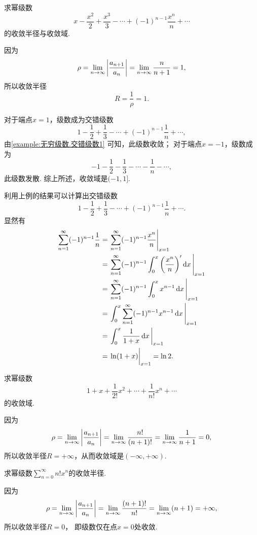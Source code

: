 \begin{example}
求幂级数\[
x-\frac{x^2}{2}+\frac{x^3}{3}-\dotsb+(-1)^{n-1}\frac{x^n}{n}+\dotsb
\]的收敛半径与收敛域.
\begin{solution}
因为\[
\rho = \lim\limits_{n\to\infty} \abs{\frac{a_{n+1}}{a_n}}
= \lim\limits_{n\to\infty} \frac{n}{n+1} = 1,
\]所以收敛半径\[
R = \frac{1}{\rho} = 1.
\]

对于端点\(x=1\)，级数成为交错级数\[
1-\frac{1}{2}+\frac{1}{3}-\dotsb+(-1)^{n-1}\frac{1}{n}+\dotsb,
\]由\cref{example:无穷级数.交错级数1} 可知，此级数收敛；
对于端点\(x=-1\)，级数成为\[
-1-\frac{1}{2}-\frac{1}{3}-\dotsb-\frac{1}{n}-\dotsb,
\]此级数发散.
综上所述，收敛域是\((-1,1]\).
\end{solution}
\end{example}
利用上例的结果可以计算出交错级数\[
1-\frac{1}{2}+\frac{1}{3}-\dotsb+(-1)^{n-1}\frac{1}{n}+\dotsb.
\]显然有
\begin{align*}
\sum\limits_{n=1}^\infty (-1)^{n-1} \frac{1}{n}
&= \eval{\sum\limits_{n=1}^\infty (-1)^{n-1} \frac{x^n}{n}}_{x=1} \\
&= \eval{\sum\limits_{n=1}^\infty (-1)^{n-1} \int_0^x \left(\frac{x^n}{n}\right)' \dd{x}}_{x=1} \\
&= \eval{\sum\limits_{n=1}^\infty (-1)^{n-1} \int_0^x x^{n-1} \dd{x}}_{x=1} \\
&= \eval{\int_0^x \sum\limits_{n=1}^\infty (-1)^{n-1} x^{n-1} \dd{x}}_{x=1} \\
&= \eval{\int_0^x \frac{1}{1+x} \dd{x}}_{x=1} \\
&= \eval{\ln(1+x)}_{x=1} = \ln2.
\end{align*}

\begin{example}
求幂级数\[
1+x+\frac{1}{2!}x^2+\dotsb+\frac{1}{n!}x^n+\dotsb
\]的收敛域.
\begin{solution}
因为\[
\rho = \lim\limits_{n\to\infty} \abs{\frac{a_{n+1}}{a_n}}
= \lim\limits_{n\to\infty} \frac{n!}{(n+1)!}
= \lim\limits_{n\to\infty} \frac{1}{n+1}
= 0,
\]所以收敛半径\(R = +\infty\)，从而收敛域是\((-\infty,+\infty)\).
\end{solution}
\end{example}

\begin{example}
求幂级数\(\sum\limits_{n=0}^\infty n! x^n\)的收敛半径.
\begin{solution}
因为\[
	\rho
	= \lim\limits_{n\to\infty} \abs{\frac{a_{n+1}}{a_n}}
	= \lim\limits_{n\to\infty} \frac{(n+1)!}{n!}
	= \lim_{n\to\infty} (n+1)
	= +\infty,
\]
所以收敛半径\(R = 0\)，
即级数仅在点\(x = 0\)处收敛.
\end{solution}
\end{example}


